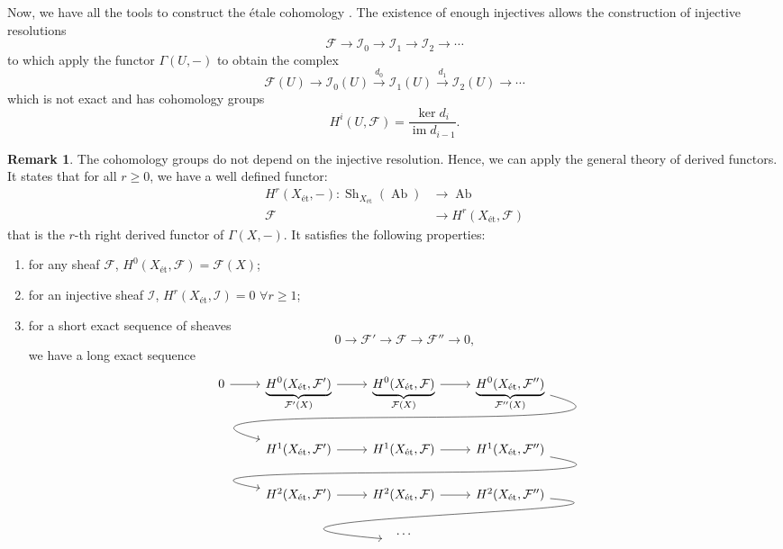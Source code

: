 \documentclass{report}
\DeclareMathOperator{\Sh}{Sh}
\DeclareMathOperator{\im}{im}
\DeclareMathOperator{\Ab}{Ab}
\theoremstyle{definition}
\newtheorem{remark}[theorem]{Remark}
\begin{document}
Now, we have all the tools to construct the \'{e}tale cohomology \cite[Section~I.9]{milne2013lectures}. The existence of enough injectives allows the construction of injective resolutions
\[\mathcal{F}\longrightarrow\mathcal{I}_0\longrightarrow\mathcal{I}_1\longrightarrow\mathcal{I}_2\longrightarrow\cdots\]
to which apply the functor $\Gamma(U,-)$ to obtain the complex
\[\mathcal{F}(U)\longrightarrow\mathcal{I}_0(U)\overset{d_0}{\longrightarrow}\mathcal{I}_1(U)\overset{d_1}{\longrightarrow}\mathcal{I}_2(U)\longrightarrow\cdots\]
which is not exact and has cohomology groups
\[H^i(U,\mathcal{F})=\frac{\ker d_i}{\im d_{i-1}}.\]

\begin{remark}
The cohomology groups do not depend on the injective resolution. Hence, we can apply the general theory of derived functors. It states that for all $r\geq0$, we have a well defined functor:
\begin{align*}
H^r(X_{\text{\'{e}t}},-):\Sh_{X_{\text{\'{e}t}}}(\Ab)&\longrightarrow\Ab\\
\mathcal{F}&\longrightarrow H^r(X_{\text{\'{e}t}},\mathcal{F})
\end{align*}
that is the $r$-th right derived functor of $\Gamma(X,-)$. It satisfies the following properties:
\begin{enumerate}
\item for any sheaf $\mathcal{F}$, $H^0(X_{\text{\'{e}t}},\mathcal{F})=\mathcal{F}(X)$;
\item for an injective sheaf $\mathcal{I}$, $H^r(X_{\text{\'{e}t}},\mathcal{I})=0$ $\forall r\geq1$;
\item for a short exact sequence of sheaves
\[0\longrightarrow\mathcal{F}'\longrightarrow\mathcal{F}\longrightarrow\mathcal{F}''\longrightarrow0,\]
we have a long exact sequence
\[
\begin{tikzcd}
0\arrow[r]&\underbrace{H^0(X_{\text{\'{e}t}},\mathcal{F}')}_{\mathcal{F}'(X)}\arrow[r]&\underbrace{H^0(X_{\text{\'{e}t}},\mathcal{F})}_{\mathcal{F}(X)}\arrow[r]&\underbrace{H^0(X_{\text{\'{e}t}},\mathcal{F}'')}_{\mathcal{F}''(X)}\arrow[lld,out=345,in=165,looseness=1.4]\\
&H^1(X_{\text{\'{e}t}},\mathcal{F}')\arrow[r]&H^1(X_{\text{\'{e}t}},\mathcal{F})\arrow[r]&H^1(X_{\text{\'{e}t}},\mathcal{F}'')\arrow[lld,out=350,in=170,looseness=1.4]\\
&H^2(X_{\text{\'{e}t}},\mathcal{F}')\arrow[r]&H^2(X_{\text{\'{e}t}},\mathcal{F})\arrow[r]&H^2(X_{\text{\'{e}t}},\mathcal{F}'')\arrow[lld,out=355,in=175,looseness=1.4,shorten >= -2.5cm]\\
&\null&\ldots
\end{tikzcd}
\]
\end{enumerate}
\end{remark}
\end{document}
